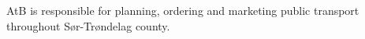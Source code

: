 AtB is responsible for planning, ordering and marketing public transport throughout Sør-Trøndelag county.



